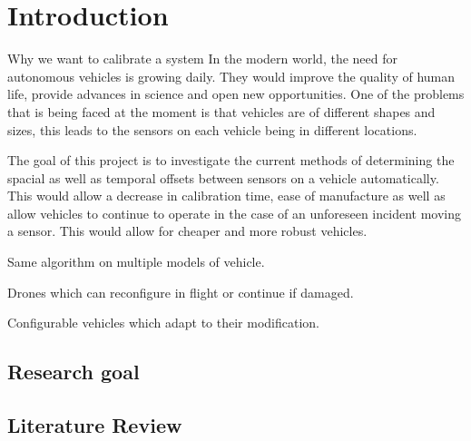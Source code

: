 \documentclass[BCOR13mm,DIV15]{scrartcl}
\begin{document}
\newpage
\tableofcontents
\pagebreak


\section{Introduction}

Why we want to calibrate a system
In the modern world, the need for autonomous vehicles is growing daily. They would improve the quality of human life, provide advances in science and open new opportunities. One of the problems that is being faced at the moment is that vehicles are of different shapes and sizes, this leads to the sensors on each vehicle being in different locations. 

The goal of this project is to investigate the current methods of determining the spacial as well as temporal offsets between sensors on a vehicle automatically. This would allow a decrease in calibration time, ease of manufacture as well as allow vehicles to continue to operate in the case of an unforeseen incident moving a sensor. 
This would allow for cheaper and more robust vehicles.


Same algorithm on multiple models of vehicle. 

Drones which can reconfigure in flight or continue if damaged.

Configurable vehicles which adapt to their modification.


\subsection{Research goal}




\subsection{Literature Review}





\end{document}
